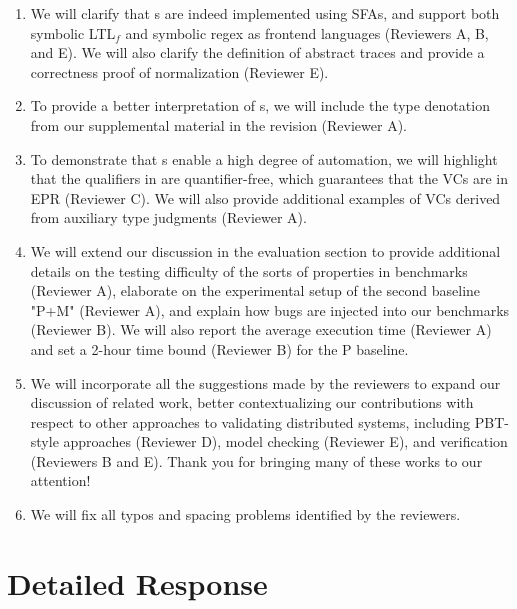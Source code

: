 \begin{enumerate}
\item We will clarify that \PAT{}s are indeed implemented using SFAs,
  and support both symbolic LTL$_f$ and symbolic regex as frontend
  languages (Reviewers A, B, and E). We will also clarify the
  definition of abstract traces and provide a correctness proof of
  normalization (Reviewer E).

\item To provide a better interpretation of \PAT{}s, we will include
  the type denotation from our supplemental material in the
  revision (Reviewer A).

\item To demonstrate that \PAT{}s enable a high degree of automation,
  we will highlight that the qualifiers in \PAT{} are quantifier-free,
  which guarantees that the VCs are in EPR (Reviewer C). We will also
  provide additional examples of VCs derived from auxiliary type
  judgments (Reviewer A).

\item We will extend our discussion in the evaluation section to
  provide additional details on the testing difficulty of the sorts of
  properties in benchmarks (Reviewer A), elaborate on the
  experimental setup of the second baseline "P+M" (Reviewer A), and
  explain how bugs are injected into our benchmarks (Reviewer B). We
  will also report the average execution time (Reviewer A) and set a
  2-hour time bound (Reviewer B) for the P baseline.

\item We will incorporate all the suggestions made by the reviewers to
  expand our discussion of related work, better contextualizing our
  contributions with respect to other approaches to validating
  distributed systems, including PBT-style approaches (Reviewer D),
  model checking (Reviewer E), and verification (Reviewers B and E).
  Thank you for bringing many of these works to our attention!

\item We will fix all typos and spacing problems identified by the
  reviewers.

\end{enumerate}

\section{Detailed Response}

